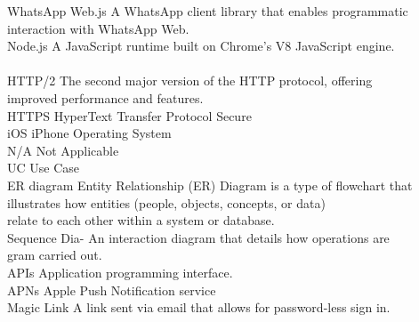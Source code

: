 \documentclass[12pt,a4paper,twoside]{report}
\begin{document}
\begin{singlespace}
\begin{tabbing}
        WhatsApp Web.js \> A WhatsApp client library that enables programmatic \\
        \> interaction with WhatsApp Web. \cite{def:whatsappwebjs} \\[0.5em]

        Node.js \> A JavaScript runtime built on Chrome's V8 JavaScript engine. \\
        \> \cite{def:nodejs} \\[0.5em]

        HTTP/2 \> The second major version of the HTTP protocol, offering \\
        \> improved performance and features. \cite{def:http2} \\[0.5em]

        HTTPS \> HyperText Transfer Protocol Secure \\[0.5em]

        iOS \> iPhone Operating System \\[0.5em]

        N/A \> Not Applicable \\[0.5em]

        UC \> Use Case \\[0.5em]

        ER diagram \> Entity Relationship (ER) Diagram is a type of flowchart that \\
        \> illustrates how entities (people, objects, concepts, or data) \\
        \> relate to each other within a system or database. \\[0.5em]

        Sequence Dia- \> An interaction diagram that details how operations are \\
        gram \> carried out. \\[0.5em]

        APIs \> Application programming interface. \\[0.5em]

        APNs \> Apple Push Notification service \\[0.5em]

        Magic Link \> A link sent via email that allows for password-less sign in.
    \end{tabbing}

\end{singlespace}

\end{document}
